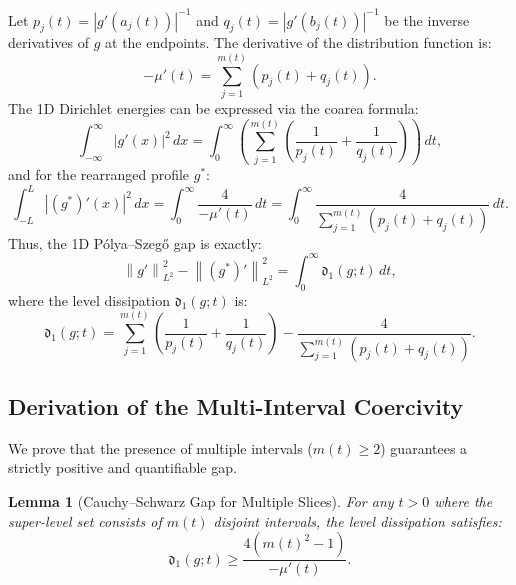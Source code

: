 \documentclass[11pt]{article}
\newtheorem{lemma}[theorem]{Lemma}
\theoremstyle{definition}
\newcommand{\norm}[1]{\left\|#1\right\|}
\begin{document}
Let $p_j(t) = |g'(a_j(t))|^{-1}$ and $q_j(t) = |g'(b_j(t))|^{-1}$ be the inverse derivatives of $g$ at the endpoints. The derivative of the distribution function is:
\begin{equation}
-\mu'(t) = \sum_{j=1}^{m(t)} (p_j(t) + q_j(t)).
\end{equation}
The 1D Dirichlet energies can be expressed via the coarea formula:
\begin{equation}
\int_{-\infty}^\infty |g'(x)|^2 \, dx = \int_0^\infty \left( \sum_{j=1}^{m(t)} \left( \frac{1}{p_j(t)} + \frac{1}{q_j(t)} \right) \right) \, dt,
\end{equation}
and for the rearranged profile $g^*$:
\begin{equation}
\int_{-L}^L |(g^*)'(x)|^2 \, dx = \int_0^\infty \frac{4}{-\mu'(t)} \, dt = \int_0^\infty \frac{4}{\sum_{j=1}^{m(t)} (p_j(t) + q_j(t))} \, dt.
\end{equation}
Thus, the 1D Pólya--Szegő gap is exactly:
\begin{equation}\label{eq:1d-gap-exact}
\norm{g'}_{L^2}^2 - \norm{(g^*)'}_{L^2}^2 = \int_0^\infty \mathfrak{d}_1(g; t) \, dt,
\end{equation}
where the level dissipation $\mathfrak{d}_1(g; t)$ is:
\begin{equation}
\mathfrak{d}_1(g; t) = \sum_{j=1}^{m(t)} \left( \frac{1}{p_j(t)} + \frac{1}{q_j(t)} \right) - \frac{4}{\sum_{j=1}^{m(t)} (p_j(t) + q_j(t))}.
\end{equation}

\subsection{Derivation of the Multi-Interval Coercivity}

We prove that the presence of multiple intervals ($m(t) \ge 2$) guarantees a strictly positive and quantifiable gap.

\begin{lemma}[Cauchy--Schwarz Gap for Multiple Slices]\label{lem:1d-cs}
For any $t > 0$ where the super-level set consists of $m(t)$ disjoint intervals, the level dissipation satisfies:
\begin{equation}
\mathfrak{d}_1(g; t) \ge \frac{4(m(t)^2 - 1)}{-\mu'(t)}.
\end{equation}
\end{lemma}
\end{document}
